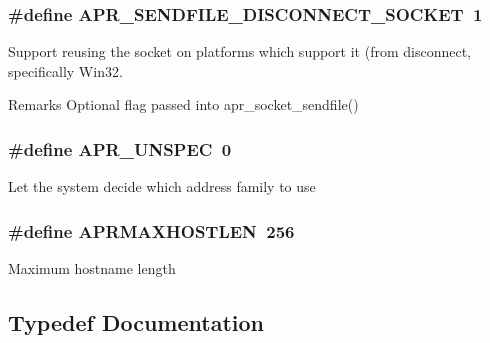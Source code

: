 \subsubsection[{\texorpdfstring{A\+P\+R\+\_\+\+S\+E\+N\+D\+F\+I\+L\+E\+\_\+\+D\+I\+S\+C\+O\+N\+N\+E\+C\+T\+\_\+\+S\+O\+C\+K\+ET}{APR_SENDFILE_DISCONNECT_SOCKET}}]{\setlength{\rightskip}{0pt plus 5cm}\#define A\+P\+R\+\_\+\+S\+E\+N\+D\+F\+I\+L\+E\+\_\+\+D\+I\+S\+C\+O\+N\+N\+E\+C\+T\+\_\+\+S\+O\+C\+K\+ET~1}\hypertarget{group__apr__network__io_gaca378d0e24b1588e3fdb143e4ea9090d}{}\label{group__apr__network__io_gaca378d0e24b1588e3fdb143e4ea9090d}
Support reusing the socket on platforms which support it (from disconnect, specifically Win32. \begin{DoxyRemark}{Remarks}
Optional flag passed into apr\+\_\+socket\+\_\+sendfile() 
\end{DoxyRemark}
\subsubsection[{\texorpdfstring{A\+P\+R\+\_\+\+U\+N\+S\+P\+EC}{APR_UNSPEC}}]{\setlength{\rightskip}{0pt plus 5cm}\#define A\+P\+R\+\_\+\+U\+N\+S\+P\+EC~0}\hypertarget{group__apr__network__io_gaa7a33b17a7d0820b09ef489bd3328f85}{}\label{group__apr__network__io_gaa7a33b17a7d0820b09ef489bd3328f85}
Let the system decide which address family to use 
\subsubsection[{\texorpdfstring{A\+P\+R\+M\+A\+X\+H\+O\+S\+T\+L\+EN}{APRMAXHOSTLEN}}]{\setlength{\rightskip}{0pt plus 5cm}\#define A\+P\+R\+M\+A\+X\+H\+O\+S\+T\+L\+EN~256}\hypertarget{group__apr__network__io_ga7f5b3882209106bb407b1d518d6ad59d}{}\label{group__apr__network__io_ga7f5b3882209106bb407b1d518d6ad59d}
Maximum hostname length 

\subsection{Typedef Documentation}
